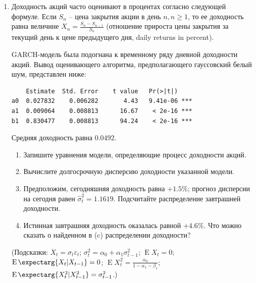 \documentclass[a4paper,12pt]{extreport}
\renewcommand{\=}[1]{\stackrel{#1}{=}} %
\newcommand{\Expect}{\mathop{{}\mathrm{E}}}
\newcommand{\Expectmore}{\operatorname{E}\expectarg}
\begin{document}
\begin{enumerate}
	\item Доходность акций часто оценивают в процентах согласно следующей формуле.
	Если $S_n$ -- цена закрытия акции в день $n, n \geqslant 1$, то ее доходность равна величине
	$X_n = \frac{S_n - S_{n-1}}{S_n}$ (отношение прироста цены закрытия
	за текущий день к цене предыдущего дня, daily returns in percent). 

	GARCH-модель была подогнана к временному ряду
	дневной доходности акций. Вывод оценивающего алгоритма, предполагающего
	гауссовский белый шум, представлен ниже:
	\vspace{-.5em}
	\begin{verbatim}
    Estimate  Std. Error    t value   Pr(>|t|)
a0  0.027832    0.006282       4.43   9.41e-06 ***
a1  0.009064    0.008813      16.67    < 2e-16 ***
b1  0.830477    0.008813      94.24    < 2e-16 ***
	\end{verbatim}
	\vspace{-.5em}
	Средняя доходность равна 0.0492.
	\begin{enumerate}
		\item Запишите уравнения модели, определяющие процесс доходности акций.
		\item Вычислите долгосрочную дисперсию доходности указанной модели.
		\item Предположим, сегодняшняя доходность равна $+1.5\%$; прогноз
		дисперсии на сегодня равен $\widehat{\sigma}^2_t = 1.1619$. 
		Подсчитайте распределение завтрашней доходности.
		\item Истинная завтрашняя доходность оказалась равной $+4.6\%$. 
		Что можно сказать о найденном в (c) распределении доходности?
	\end{enumerate}
	(Подсказки: $X_t = \sigma_t \varepsilon_t$;
	$\sigma^2_t = \alpha_0 + \alpha_1 \sigma^2_{t-1}$;
	$\Expect X_t = 0$; $\Expectmore{X_t | X_{t-1}} = 0$; 
	$\Expect X^2_t = \frac{\alpha_0}{1 - \alpha_1 - \beta_1}$;
	$\Expectmore{X^2_t | X^2_{t-1}} = \sigma^2_{t-1}$.)



\end{enumerate}
\end{document}
